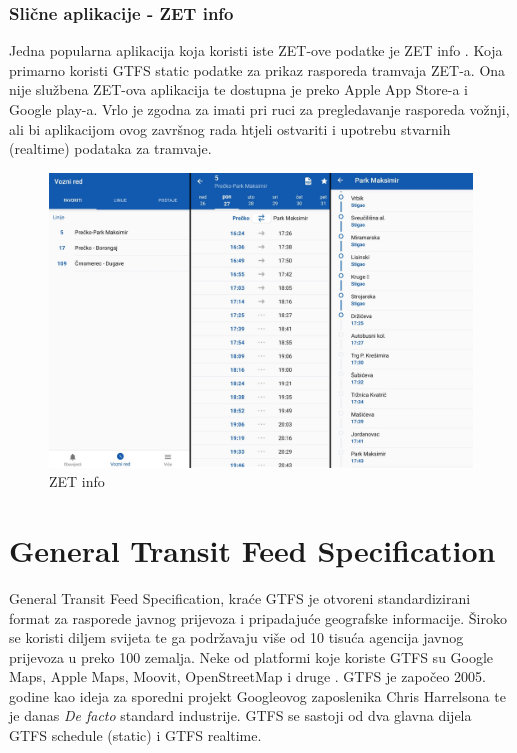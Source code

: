 \documentclass[zavrsnirad]{fer}
\begin{document}
\subsubsection{Slične aplikacije - ZET info}
Jedna popularna aplikacija koja koristi iste ZET-ove podatke je ZET info \cite{ZET-info}. Koja primarno koristi GTFS static podatke za prikaz rasporeda tramvaja ZET-a. Ona nije službena ZET-ova aplikacija te dostupna je preko Apple App Store-a i Google play-a. Vrlo je zgodna za imati pri ruci za pregledavanje rasporeda vožnji, ali bi aplikacijom ovog završnog rada htjeli ostvariti i upotrebu stvarnih (realtime) podataka za tramvaje.


\begin{figure}[htb]
	\centering
	\includegraphics[width=0.85\linewidth]{Figures/zetinfo.png} 
	\caption{ZET info}
	\label{slk:zet-info}
\end{figure}

\newpage
\section[GTFS]{General Transit Feed Specification}
\label{sec:GTFS}

General Transit Feed Specification, kraće GTFS je otvoreni standardizirani format za rasporede
javnog prijevoza i pripadajuće geografske informacije. Široko se koristi diljem svijeta te ga
podržavaju više od 10 tisuća agencija javnog prijevoza u preko 100 zemalja. Neke od platformi koje
koriste GTFS su Google Maps, Apple Maps, Moovit, OpenStreetMap i druge \cite{GTFS}. GTFS je započeo 2005. godine kao ideja za sporedni projekt Googleovog zaposlenika Chris Harrelsona te je danas \textit{De facto} standard industrije. GTFS se sastoji od dva glavna dijela GTFS schedule (static) i GTFS realtime.
\end{document}
